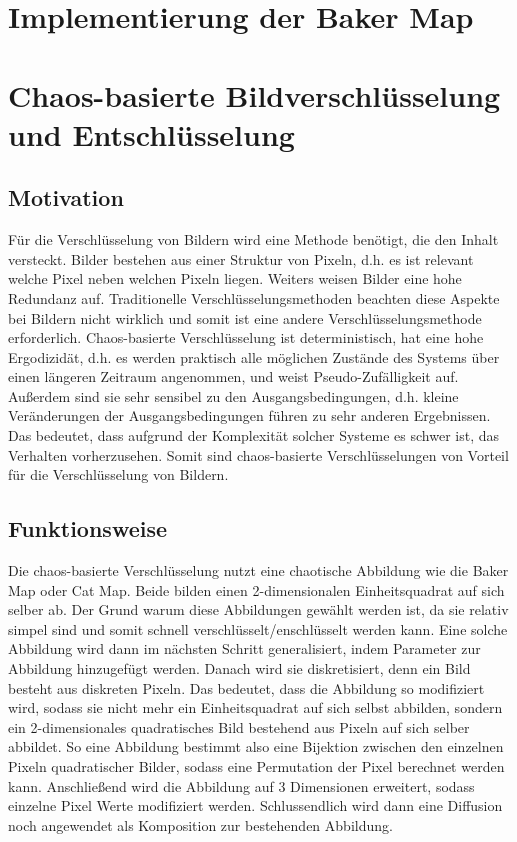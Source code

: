 
\usepackage[naustrian]{babel}


\maketitle

\section{Implementierung der Baker Map}
% 

\section{Chaos-basierte Bildverschlüsselung und Entschlüsselung}
\subsection{Motivation}
Für die Verschlüsselung von Bildern wird eine Methode benötigt, die den Inhalt
versteckt. Bilder bestehen aus einer Struktur von Pixeln, d.h. es ist relevant welche Pixel neben welchen
Pixeln liegen. Weiters weisen Bilder eine hohe Redundanz auf. Traditionelle Verschlüsselungsmethoden beachten
diese Aspekte bei Bildern nicht wirklich und somit ist eine andere Verschlüsselungsmethode erforderlich.
Chaos-basierte Verschlüsselung ist deterministisch, hat eine hohe Ergodizidät, d.h. es werden praktisch alle
möglichen Zustände des Systems über einen längeren Zeitraum angenommen, und weist Pseudo-Zufälligkeit auf. Außerdem
sind sie sehr sensibel zu den Ausgangsbedingungen, d.h. kleine Veränderungen der Ausgangsbedingungen führen zu
sehr anderen Ergebnissen. Das bedeutet, dass aufgrund der Komplexität solcher Systeme es schwer ist,
das Verhalten vorherzusehen.
Somit sind chaos-basierte Verschlüsselungen von Vorteil für die Verschlüsselung von Bildern.
\cite{zhang2023}

\subsection{Funktionsweise}
Die chaos-basierte Verschlüsselung nutzt eine chaotische Abbildung wie die Baker Map oder Cat Map. Beide bilden
einen 2-dimensionalen Einheitsquadrat auf sich selber ab. Der Grund warum diese Abbildungen gewählt werden ist, da
sie relativ simpel sind und somit schnell verschlüsselt/enschlüsselt werden kann. 
Eine solche Abbildung wird dann im nächsten Schritt generalisiert, indem Parameter zur Abbildung hinzugefügt werden.
Danach wird sie diskretisiert, denn ein Bild besteht aus diskreten Pixeln. Das bedeutet, dass die Abbildung so
modifiziert wird, sodass sie nicht mehr ein Einheitsquadrat auf sich selbst abbilden, sondern ein 2-dimensionales quadratisches
Bild bestehend aus Pixeln auf sich selber abbildet. So eine Abbildung bestimmt also eine Bijektion zwischen den einzelnen Pixeln
quadratischer Bilder, sodass eine Permutation der Pixel berechnet werden kann. Anschließend wird die Abbildung auf 3 Dimensionen erweitert,
sodass einzelne Pixel Werte modifiziert werden. Schlussendlich wird dann eine Diffusion noch angewendet als Komposition zur bestehenden
Abbildung.
\cite{IEEEMap}

